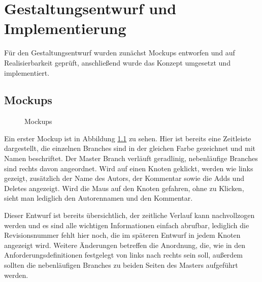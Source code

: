 \documentclass[nocolor]{tudbook}
\begin{document}
\chapter{Gestaltungsentwurf und Implementierung}
Für den Gestaltungsentwurf wurden zunächst Mockups entworfen und auf Realisierbarkeit geprüft, anschließend wurde das Konzept umgesetzt und implementiert.
\section{Mockups}
\begin{figure}
\caption{Mockups}
\label{fig:mockup1}
\end{figure}

Ein erster Mockup ist in Abbildung \ref{fig:mockup1} zu sehen. Hier ist bereits eine Zeitleiste dargestellt, die einzelnen Branches sind in der gleichen Farbe gezeichnet und mit Namen beschriftet. Der Master Branch verläuft geradlinig, nebenläufige Branches sind rechts davon angeordnet. Wird auf einen Knoten geklickt, werden wie links gezeigt, zusätzlich der Name des Autors, der Kommentar sowie die Adds und Deletes angezeigt. Wird die Maus auf den Knoten gefahren, ohne zu Klicken, sieht man lediglich den Autorennamen und den Kommentar. 

Dieser Entwurf ist bereits übersichtlich, der zeitliche Verlauf kann nachvollzogen werden und es sind alle wichtigen Informationen einfach abrufbar, lediglich die Revisionsnummer fehlt hier noch, die im späteren Entwurf in jedem Knoten angezeigt wird. Weitere Änderungen betreffen die Anordnung, die, wie in den Anforderungsdefinitionen festgelegt von links nach rechts sein soll, außerdem sollten die nebenläufigen Branches zu beiden Seiten des Masters aufgeführt werden.
\end{document}
